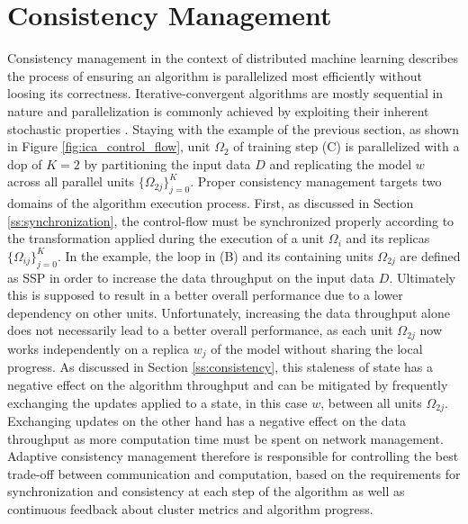 
\chapter{Consistency Management}
\label{c:consistency_mgmt}
Consistency management in the context of distributed machine learning describes the process of ensuring an algorithm is parallelized most efficiently without loosing its correctness.
Iterative-convergent algorithms are mostly sequential in nature and parallelization is commonly achieved by exploiting their inherent stochastic properties \cite{herb2016weak}.
Staying with the example of the previous section, as shown in Figure \ref{fig:ica_control_flow}, unit $\Omega_2$ of training step (C) is parallelized with a dop of $K = 2$ by partitioning the input data $D$ and replicating the model $w$ across all parallel units $\{\Omega_{2j}\}_{j=0}^K$.
Proper consistency management targets two domains of the algorithm execution process.
First, as discussed in Section \ref{ss:synchronization}, the control-flow must be synchronized properly according to the transformation applied during the execution of a unit $\Omega_i$ and its replicas $\{\Omega_{ij}\}_{j=0}^K$.
In the example, the loop in (B) and its containing units $\Omega_{2j}$ are defined as SSP in order to increase the data throughput on the input data $D$.
Ultimately this is supposed to result in a better overall performance due to a lower dependency on other units.
Unfortunately, increasing the data throughput alone does not necessarily lead to a better overall performance, as each unit $\Omega_{2j}$ now works independently on a replica $w_j$ of the model without sharing the local progress.
As discussed in Section \ref{ss:consistency}, this staleness of state has a negative effect on the algorithm throughput and can be mitigated by frequently exchanging the updates applied to a state, in this case $w$, between all units $\Omega_{2j}$.
Exchanging updates on the other hand has a negative effect on the data throughput as more computation time must be spent on network management.
Adaptive consistency management therefore is responsible for controlling the best trade-off between communication and computation, based on the requirements for synchronization and consistency at each step of the algorithm as well as continuous feedback about cluster metrics and algorithm progress.

